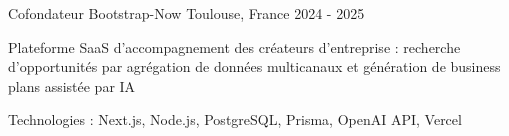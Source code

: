 \begin{cventries}
\cventry
{Cofondateur} %
{Bootstrap-Now} %
{Toulouse, France} %
{2024 - 2025} %
{ %
\begin{cvitems}
\item {Plateforme SaaS d'accompagnement des créateurs d'entreprise : recherche d'opportunités par agrégation de données multicanaux et génération de business plans assistée par IA}
\item {Technologies : Next.js, Node.js, PostgreSQL, Prisma, OpenAI API, Vercel}
\end{cvitems}
}


\end{cventries}
